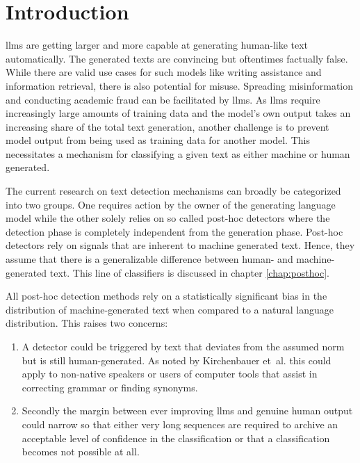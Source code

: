     \chapter{Introduction}
    \label{chap:introduction}
    
    \acfp{llm} are getting larger and more capable at generating human-like text automatically.
    The generated texts are convincing but oftentimes factually false.
    While there are valid use cases for such models like writing assistance and information retrieval, there is also potential for misuse.
    Spreading misinformation and conducting academic fraud can be facilitated by \acp{llm}.
    As \acp{llm} require increasingly large amounts of training data and the model's own output takes an increasing share of the total text generation, another challenge is to prevent model output from being used as training data for another model.
    This necessitates a mechanism for classifying a given text as either machine or human generated.

    The current research on text detection mechanisms can broadly be categorized into two groups.
    One requires action by the owner of the generating language model while the other solely relies on so called post-hoc detectors where the detection phase is completely independent from the generation phase.
    Post-hoc detectors rely on signals that are inherent to machine generated text.
    Hence, they assume that there is a generalizable difference between human- and machine-generated text.
    This line of classifiers is discussed in chapter \ref{chap:posthoc}.

    All post-hoc detection methods rely on a statistically significant bias in the distribution of machine-generated text when compared to a natural language distribution.
    This raises two concerns:
    \begin{enumerate}
        \item A detector could be triggered by text that deviates from the assumed norm but is still human-generated.
            As noted by Kirchenbauer et~al. \cite{kirchenbauer2023watermark} this could apply to non-native speakers or users of computer tools that assist in correcting grammar or finding synonyms.
        \item Secondly the margin between ever improving \acp{llm} and genuine human output could narrow so that either very long sequences are required to archive an acceptable level of confidence in the classification or that a classification becomes not possible at all.
    \end{enumerate}

